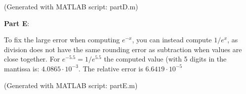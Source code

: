 \documentclass[12pt]{article}
\begin{document}
(Generated with MATLAB script: partD.m)

\noindent
\textbf{Part  E}:

To fix the large error when computing $e^{-x}$, you can instead compute $1 / e^{x}$, as division does not have the same rounding error as subtraction when values are close together. For $e^{-5.5} = 1 / e^{5.5}$ the computed value (with 5 digits in the mantissa is: $4.0865 \cdot 10^{-3}$. The relative error is $6.6419 \cdot 10^{-5}$

(Generated with MATLAB script: partE.m)
\end{document}
